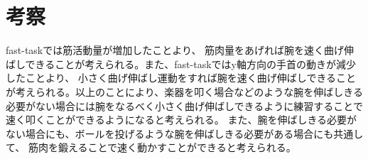 \documentclass{jsarticle}
\begin{document}
\section{考察}
fast-taskでは筋活動量が増加したことより、
筋肉量をあげれば腕を速く曲げ伸ばしできることが考えられる。また、fast-taskではy軸方向の手首の動きが減少したことより、
小さく曲げ伸ばし運動をすれば腕を速く曲げ伸ばしできることが考えられる。以上のことにより、楽器を叩く場合などのような腕を伸ばしきる必要がない場合には腕をなるべく小さく曲げ伸ばしできるように練習することで速く叩くことができるようになると考えられる。
また、腕を伸ばしきる必要がない場合にも、ボールを投げるような腕を伸ばしきる必要がある場合にも共通して、
筋肉を鍛えることで速く動かすことができると考えられる。

% 
% 
\end{document}

